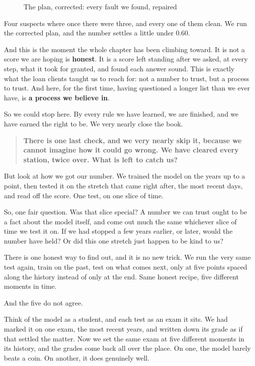 \documentclass[11pt]{article} %
\begin{document}
\begin{figure}[htbp]
\centering

\caption{The plan, corrected: every fault we found, repaired}
\end{figure}


Four suspects where once there were three, and every one of them clean. We run the corrected plan, and the number settles a little under 0.60.

And this is the moment the whole chapter has been climbing toward. It is not a score we are hoping is \textbf{honest}. It is a score left standing after we asked, at every step, what it took for granted, and found each answer sound. This is exactly what the loan clients taught us to reach for: not a number to trust, but a process to trust. And here, for the first time, having questioned a longer list than we ever have, is \textbf{a process we believe in}.

So we could stop here. By every rule we have learned, we are finished, and we have earned the right to be. We very nearly close the book.


\begin{quote}
\textbf{There is one last check, and we very nearly skip it, because we cannot imagine how it could go wrong. We have cleared every station, twice over. What is left to catch us?}
\end{quote}


But look at how we got our number. We trained the model on the years up to a point, then tested it on the stretch that came right after, the most recent days, and read off the score. One test, on one slice of time.

So, one fair question. Was that slice special? A number we can trust ought to be a fact about the model itself, and come out much the same whichever slice of time we test it on. If we had stopped a few years earlier, or later, would the number have held? Or did this one stretch just happen to be kind to us?

There is one honest way to find out, and it is no new trick. We run the very same test again, train on the past, test on what comes next, only at five points spaced along the history instead of only at the end. Same honest recipe, five different moments in time.

And the five do not agree.

Think of the model as a student, and each test as an exam it sits. We had marked it on one exam, the most recent years, and written down its grade as if that settled the matter. Now we set the same exam at five different moments in its history, and the grades come back all over the place. On one, the model barely beats a coin. On another, it does genuinely well.
\end{document}
